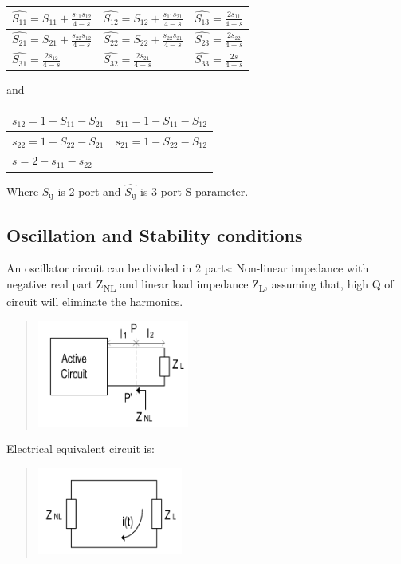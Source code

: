 \begin{longtable}[]{@{}lll@{}}
\toprule
\(\widehat{S_{11}} = S_{11} + \frac{s_{11}s_{12}}{4 - s}\) &
\(\widehat{S_{12}} = S_{12} + \frac{s_{11}s_{21}}{4 - s}\) &
\(\widehat{S_{13}} = \frac{2s_{11}}{4 - s}\)\tabularnewline
\midrule
\endhead
\(\widehat{S_{21}} = S_{21} + \frac{s_{22}s_{12}}{4 - s}\) &
\(\widehat{S_{22}} = S_{22} + \frac{s_{22}s_{21}}{4 - s}\) &
\(\widehat{S_{23}} = \frac{2s_{22}}{4 - s}\)\tabularnewline
\(\widehat{S_{31}} = \frac{2s_{12}}{4 - s}\) &
\(\widehat{S_{32}} = \frac{2s_{21}}{4 - s}\) &
\(\widehat{S_{33}} = \frac{2s}{4 - s}\)\tabularnewline
\bottomrule
\end{longtable}

and

\begin{longtable}[]{@{}ll@{}}
\toprule
\(s_{12} = 1 - S_{11} - S_{21}\) &
\(s_{11} = 1 - S_{11} - S_{12}\)\tabularnewline
\midrule
\endhead
\(s_{22} = 1 - S_{22} - S_{21}\) &
\(s_{21} = 1 - S_{22} - S_{12}\)\tabularnewline
\(s = 2 - s_{11} - s_{22}\) &\tabularnewline
\bottomrule
\end{longtable}

Where \(S_{\text{ij}}\) is 2-port and \(\widehat{S_{\text{ij}}}\) is 3
port S-parameter.

\hypertarget{oscillation-and-stability-conditions}{%
\subsection{Oscillation and Stability
conditions}\label{oscillation-and-stability-conditions}}

An oscillator circuit can be divided in 2 parts: Non-linear impedance
with negative real part Z\textsubscript{NL} and linear load impedance
Z\textsubscript{L}, assuming that, high Q of circuit will eliminate the
harmonics.

\begin{quote}
\includegraphics[width=1.95833in,height=1.375in]{media/image8.png}
\end{quote}

Electrical equivalent circuit is:

\begin{quote}
\includegraphics[width=1.875in,height=1.125in]{media/image9.png}
\end{quote}

